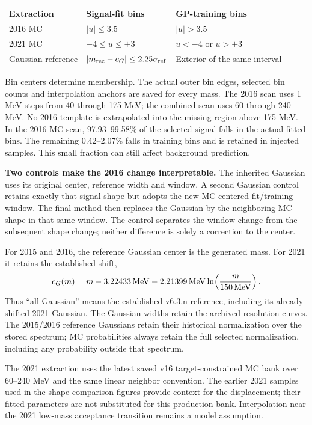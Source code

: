 \documentclass[11pt]{article}
\begin{document}
\begin{center}\begin{tabular}{lll}\toprule
Extraction & Signal-fit bins & GP-training bins\\\midrule
2016 MC & $|u|\le3.5$ & $|u|>3.5$\\
2021 MC & $-4\le u\le+3$ & $u<-4$ or $u>+3$\\
Gaussian reference & $|m_{\rm rec}-c_G|\le2.25\sigma_{\rm ref}$ & Exterior of the same interval\\\bottomrule
\end{tabular}\end{center}

Bin centers determine membership. The actual outer bin edges, selected bin counts and interpolation anchors are saved for every mass. The 2016 scan uses 1 MeV steps from 40 through 175 MeV; the combined scan uses 60 through 240 MeV. No 2016 template is extrapolated into the missing region above 175 MeV. In the 2016 MC scan, 97.93--99.58\% of the selected signal falls in the actual fitted bins. The remaining 0.42--2.07\% falls in training bins and is retained in injected samples. This small fraction can still affect background prediction.

\textbf{Two controls make the 2016 change interpretable.} The inherited Gaussian uses its original center, reference width and window. A second Gaussian control retains exactly that signal shape but adopts the new MC-centered fit/training window. The final method then replaces the Gaussian by the neighboring MC shape in that same window. The control separates the window change from the subsequent shape change; neither difference is solely a correction to the center.

For 2015 and 2016, the reference Gaussian center is the generated mass. For 2021 it retains the established shift,
\[
 c_G(m)=m-3.22433\,{\rm MeV}-2.21399\,{\rm MeV}\ln\!\left(\frac{m}{150\,{\rm MeV}}\right).
\]
Thus ``all Gaussian'' means the established v6.3.n reference, including its already shifted 2021 Gaussian. The Gaussian widths retain the archived resolution curves. The 2015/2016 reference Gaussians retain their historical normalization over the stored spectrum; MC probabilities always retain the full selected normalization, including any probability outside that spectrum.

The 2021 extraction uses the latest saved v16 target-constrained MC bank over 60--240 MeV and the same linear neighbor convention. The earlier 2021 samples used in the shape-comparison figures provide context for the displacement; their fitted parameters are not substituted for this production bank. Interpolation near the 2021 low-mass acceptance transition remains a model assumption.
\end{document}
